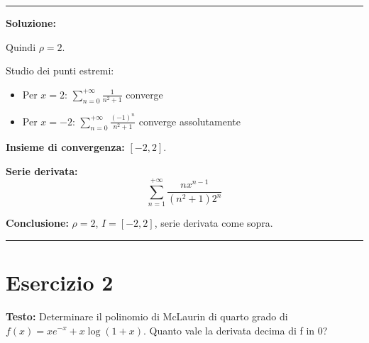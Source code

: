 \documentclass[12pt, a4paper]{article}
\newenvironment{solution}
{\par\noindent\rule{\textwidth}{0.4pt}\par\textbf{Soluzione:}\medskip\par}
{\par\rule{\textwidth}{0.4pt}\par\bigskip}
\begin{document}
\begin{solution}
Quindi $\rho = 2$.

Studio dei punti estremi:
\begin{itemize}
    \item Per $x = 2$: $\displaystyle\sum_{n=0}^{+\infty} \frac{1}{n^{2}+1}$ converge
    \item Per $x = -2$: $\displaystyle\sum_{n=0}^{+\infty} \frac{(-1)^n}{n^{2}+1}$ converge assolutamente
\end{itemize}

\textbf{Insieme di convergenza:} $[-2, 2]$.

\textbf{Serie derivata:}
\[
\sum_{n=1}^{+\infty} \frac{nx^{n-1}}{(n^{2}+1)2^{n}}
\]

\textbf{Conclusione:} $\rho = 2$, $I = [-2, 2]$, serie derivata come sopra.
\end{solution}

\newpage

\section*{Esercizio 2}

\textbf{Testo:} Determinare il polinomio di McLaurin di quarto grado di $f(x) = xe^{-x} + x \log(1+x)$. Quanto vale la derivata decima di f in 0?
\end{document}
